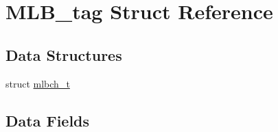 \hypertarget{structMLB__tag}{}\section{M\+L\+B\+\_\+tag Struct Reference}
\label{structMLB__tag}
\subsection*{Data Structures}
\begin{DoxyCompactItemize}
\item 
struct \mbox{\hyperlink{structMLB__tag_1_1mlbch__t}{mlbch\+\_\+t}}
\end{DoxyCompactItemize}
\subsection*{Data Fields}
